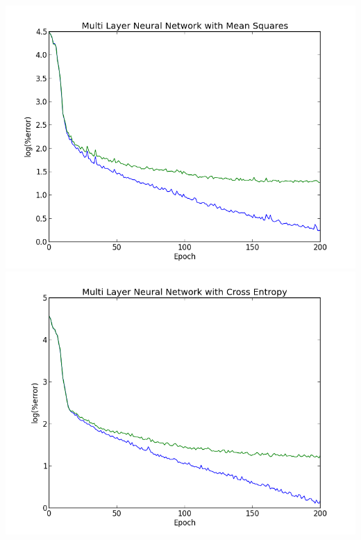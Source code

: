 \documentclass{article}
\begin{document}
\includegraphics[width=\textwidth]{mlms}
\includegraphics[width=\textwidth]{mlce}
\end{document}
